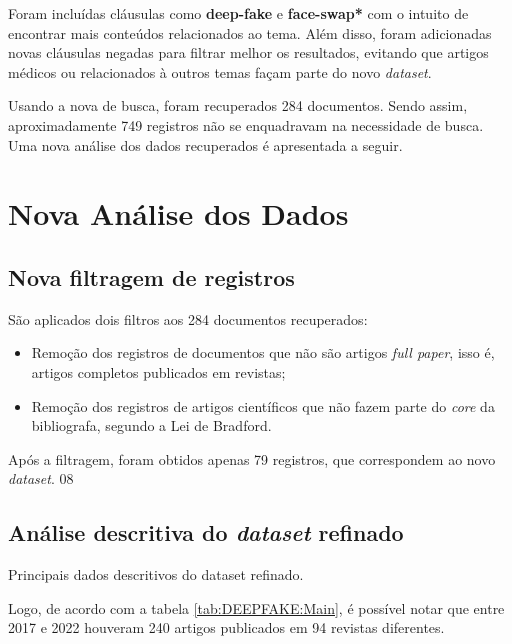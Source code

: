  Foram incluídas cláusulas como \textbf{deep-fake} e \textbf{face-swap*} com o intuito de encontrar mais conteúdos relacionados ao tema. Além disso, foram adicionadas novas cláusulas negadas para filtrar melhor os resultados, evitando que artigos médicos ou relacionados à outros temas façam parte do novo \textit{dataset}.
 
Usando a nova \textit{} de busca, foram recuperados 284 documentos. Sendo assim, aproximadamente 749 registros não se enquadravam na necessidade de busca.
Uma nova análise dos dados recuperados é apresentada a seguir.

\section{Nova Análise dos Dados}

\subsection{Nova filtragem de registros}

São aplicados dois filtros aos 284 documentos recuperados:
\begin{itemize}
    \item Remoção dos registros de documentos que não são artigos \textit{full paper}, isso é, artigos completos publicados em revistas;
    \item Remoção dos registros de artigos científicos que não fazem parte do \textit{core} da bibliografa, segundo a Lei de Bradford.
\end{itemize}

Após a filtragem, foram obtidos apenas 79 registros, que correspondem ao novo \textit{dataset}.
08
\subsection{Análise descritiva do \textit{dataset} refinado}

\begin{table}[]
    \centering
{}
    \caption{Principais dados descritivos do dataset refinado.}
    \label{tab:DEEPFAKE:Main}
\end{table}

Logo, de acordo com a tabela \ref{tab:DEEPFAKE:Main}, é possível notar que entre 2017 e 2022 houveram 240 artigos publicados em 94 revistas diferentes.